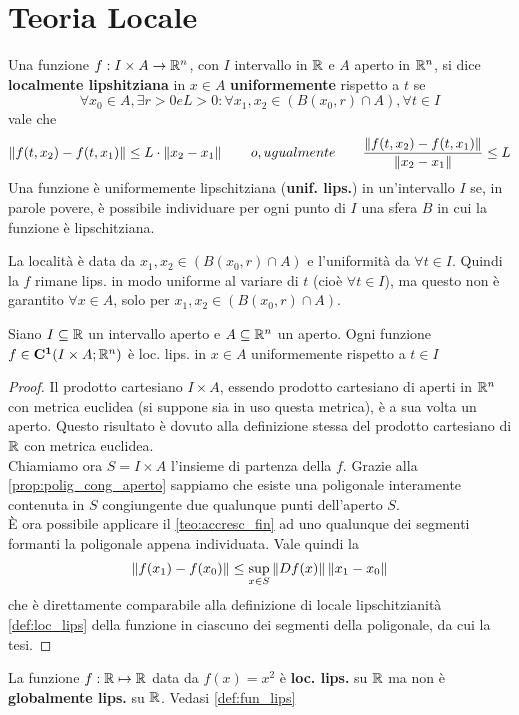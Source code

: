 \section{Teoria Locale}
\begin{definition}
	\label{def:loc_lips}
	Una funzione $f:I\times A\to \mathbb{R}^n$, con $I$ intervallo in $\mathbb{R}$ e $A$ aperto in $\mathbb{R}^n$, si dice \textbf{localmente lipshitziana} in $x\in A$ \textbf{uniformemente} rispetto a $t$ se
	$$\forall x_0 \in A, \exists r>0 e L>0: \forall x_1,x_2 \in (B(x_0,r)\cap A), \forall t\in I$$
	vale che
	$$\left\|f(t,x_2)-f(t,x_1)\right\|\leq L\cdot\left\|x_2-x_1\right\|\qquad o, ugualmente\qquad\frac{\left\|f(t,x_2)-f(t,x_1)\right\|}{\left\|x_2-x_1\right\|}\leq L$$
	Una funzione è uniformemente lipschitziana (\textbf{unif. lips.}) in un'intervallo $I$ se, in parole povere, è possibile individuare per ogni punto di $I$ una sfera $B$ in cui la funzione è lipschitziana.
\end{definition}
\begin{note}
	La località è data da $x_1,x_2 \in (B(x_0,r)\cap A)$ e l'uniformità da $\forall t\in I$. Quindi la $f$ rimane lips. in modo uniforme al variare di $t$ (cioè $\forall t\in I$), ma questo non è garantito $\forall x\in A$, solo per $x_1,x_2 \in (B(x_0,r)\cap A)$.
\end{note}
\begin{proposition}
	\label{prop:fc1_loc_lips}
	Siano $I\subseteq \mathbb{R}$ un intervallo aperto e $A\subseteq \mathbb{R}^n$ un aperto. Ogni funzione $f\in\mathbf{C^{1}}(I\times A;\mathbb{R}^n)$ è loc. lips. in $x\in A$ uniformemente rispetto a $t\in I$
	\begin{proof}
		Il prodotto cartesiano $I\times A$, essendo prodotto cartesiano di aperti in $\mathbb{R}^n$ con metrica euclidea (si suppone sia in uso questa metrica), è a sua volta un aperto. Questo risultato è dovuto alla definizione stessa del prodotto cartesiano di $\mathbb{R}$ con metrica euclidea.\\
		Chiamiamo ora $S=I\times A$ l'insieme di partenza della $f$. Grazie alla \ref{prop:polig_cong_aperto} sappiamo che esiste una poligonale interamente contenuta in $S$ congiungente due qualunque punti dell'aperto $S$.\\
		È ora possibile applicare il \ref{teo:accresc_fin} ad uno qualunque dei segmenti formanti la poligonale appena individuata. Vale quindi la
		$$\left\|f(x_1)-f(x_0)\right\|\le \sup\limits_{x\in S}\left\|Df(x)\right\|\left\|x_1-x_0\right\|$$
		che è direttamente comparabile alla definizione di locale lipschitzianità \ref{def:loc_lips} della funzione in ciascuno dei segmenti della poligonale, da cui la tesi.
	\end{proof}
\end{proposition}
\begin{example}
	La funzione $f:\mathbb{R}\mapsto\mathbb{R}$ data da $f(x)=x^2$ è \textbf{loc. lips.} su $\mathbb{R}$ ma non è \textbf{globalmente lips.} su $\mathbb{R}$. Vedasi \ref{def:fun_lips}
\end{example}

